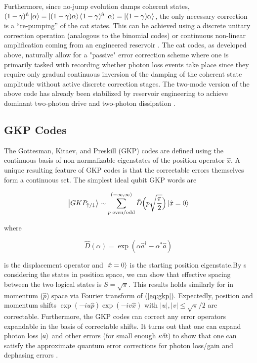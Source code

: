 \documentclass[12]{amsart}
\newcommand\0{\mathbf{0}}
\newcommand\<{\langle}
\renewcommand\>{\rangle}
\begin{document}
Furthermore, since no-jump evolution damps coherent states, $(1 - \gamma)^{\hat{n}}\ket{\alpha} = \ket{(1 - \gamma) \alpha}(1 - \gamma)^{\hat{n}}\ket{\alpha} = \ket{(1 - \gamma) \alpha}$, the only necessary correction is a “re-pumping” of the cat states. This can be achieved using a discrete unitary correction operation (analogous to the binomial codes) or continuous non-linear amplification coming from an engineered reservoir \cite{leghtas2013hardware, mirrahimi2014dynamically}. The cat codes, as developed above, naturally allow for a "passive" error correction scheme where one is primarily tasked with recording whether photon loss events take place since they require only gradual continuous inversion of the damping of the coherent state amplitude without active discrete correction stages. The two-mode version of the above code has already been stabilized by reservoir engineering to achieve dominant two-photon drive and two-photon dissipation \cite{leghtas2015confining}.

\subsection{GKP Codes}

The Gottesman, Kitaev, and Preskill (GKP) codes \cite{gottesman2001encoding} are defined using the continuous basis of non-normalizable eigenstates of the position operator $\hat{x}$. A unique resulting feature of GKP codes is that the correctable errors themselves form a continuous set. The simplest ideal qubit GKP words are

\begin{align}
\label{eq:gkp}
\ket{GKP_{\uparrow/\downarrow}} \sim \sum_{p\text{ even/odd}}^{(-\infty, \infty)} \hat{D}\Big(p \sqrt{\frac{\pi}{2}} \Big) \ket{\hat{x} = 0} 	
\end{align}


  where 
  
  $$\hat{D}(\alpha) = \exp(\alpha \hat{a}^\dag - \alpha^* \hat{a})$$
  
  is the displacement operator and $\ket{\hat{x} = 0}$ is the starting position eigenstate.By s considering the states in position space, we can show that effective spacing between the two logical states is $S=\sqrt{\pi}$. This results holds similarly for in momentum ($\hat{p}$) space via Fourier transform of (\ref{eq:gkp}). Expectedly, position and momentum shifts $\exp(-iu\hat{p})\exp(-iv\hat{x})$ with $|u|, |v| \leq \sqrt{\pi}/2$ are correctable. Furthermore, the GKP codes can correct any error operators expandable in the basis of correctable shifts. It turns out that one can expand photon loss $\ket{a}$ and other errors (for small enough $\kappa \delta t$) to show that one can satisfy the approximate quantum error corrections for photon loss/gain and dephasing errors \cite{michael2016new}.
  
\end{document}
